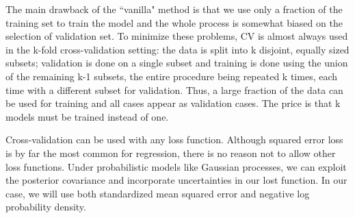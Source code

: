 \documentclass[12pt,a4paper,oneside]{book}
\theoremstyle{plain}
\theoremstyle{definition}
\begin{document}
{\vspace{3mm}
\noindent
The main drawback of the ``vanilla" method is that we use only a fraction of the training set to train the model and the whole process is somewhat biased on the selection of validation set. To minimize these problems, CV is almost always used in the k-fold cross-validation setting: the data is split into k disjoint, equally sized subsets; validation is done on a single subset and training is done using the union of the remaining k-1 subsets, the entire procedure being repeated k times, each time with a different subset for validation. Thus, a large fraction of the data can be used for training and all cases appear as validation cases. The price is that k models must be trained instead of one. 

\vspace{3mm}
\noindent
Cross-validation can be used with any loss function. Although squared error loss is by far the most common for regression, there is no reason not to allow other loss functions. Under probabilistic models like Gaussian processes, we can exploit the posterior covariance and incorporate uncertainties in our lost function. In our case, we will use both standardized mean squared error and negative log probability density. 

}
\end{document}
